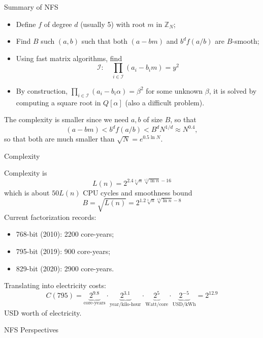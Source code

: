 \documentclass[t]{beamer}
\begin{document}
\begin{frame}{Summary of NFS}
    \begin{itemize}
        \item Define $f$ of degree $d$ (usually 5) with root $m$ in $\mathbb{Z}_N$;
        \item Find $B$ such $(a,b)$ such that both $(a-bm)$ and $b^df(a/b)$ are $B$-smooth;
        \item Using fast matrix algorithms, find
        $$
        \mathcal{I}:\quad \prod_{i \in \mathcal{I}}(a_i-b_im) = y^2
        $$
        \item By construction, $\prod_{i \in \mathcal{I}}(a_i-b_i\alpha) = \beta^2$ for some unknown $\beta$, it is solved by computing a square root in $Q[\alpha]$ (also a difficult problem).
        
     \end{itemize}
     The complexity is smaller since we need $a,b$ of size $B$, so that  $$
     (a-bm)<b^df(a/b) <B^{d}N^{1/d}\approx N^{0.4},
     $$
     so that both are much smaller than $\sqrt{N}= e^{0.5 \ln N}$.
     \end{frame}

\begin{frame}{Complexity}

     Complexity is
     $$
     L(n) = 2^{2.4\sqrt[3]{n}\sqrt[1.5]{\ln n}-16}
     $$
     which is about $50L(n)$ CPU cycles
     and smoothness bound
     $$
     B = \sqrt{L(n)} = 2^{1.2\sqrt[3]{n}\sqrt[1.5]{\ln n}-8}
     $$
     Current factorization records:
     \begin{itemize}
         \item 768-bit (2010): 2200 core-years;
         \item 795-bit (2019): 900 core-years;
         \item 829-bit (2020):  2900 core-years.
     \end{itemize}
     Translating into electricity costs:
     \begin{equation}\label{c795}
C(795) = 
\underbrace{2^{9.8}}_{\text{core-years}}\cdot
\underbrace{2^{3.1}}_{\text{year/kilo-hour}}\cdot
\underbrace{2^{5}}_{\text{Watt/core}}\cdot
\underbrace{2^{-5}}_{\text{USD/kWh}}=
2^{12.9}    
\end{equation}
 USD worth of electricity.
\end{frame}

\begin{frame}[c]
\begin{center}
    \Large{NFS Perspectives}
    \end{center}
\end{frame}
\end{document}

